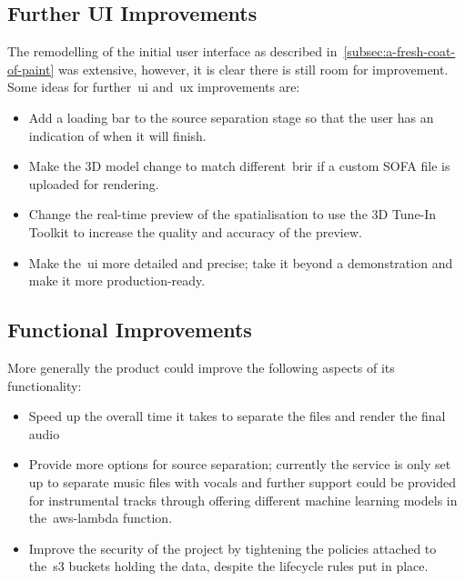 \subsection{Further UI Improvements}\label{subsec:ui-improvements}

The remodelling of the initial user interface as described in~\ref{subsec:a-fresh-coat-of-paint} was extensive,
however, it is clear there is still room for improvement.
Some ideas for further~\gls{ui} and~\gls{ux} improvements are:
\begin{itemize}
    \item Add a loading bar to the source separation stage so that the user has an indication of when it will finish.
    \item Make the 3D model change to match different~\gls{brir} if a custom SOFA file is uploaded for rendering.
    \item Change the real-time preview of the spatialisation to use the 3D Tune-In Toolkit to increase the quality and accuracy of the preview.
    \item Make the~\gls{ui} more detailed and precise; take it beyond a demonstration and make it more production-ready.
\end{itemize}

\subsection{Functional Improvements}\label{subsec:functional-improvements}

More generally the product could improve the following aspects of its functionality:

\begin{itemize}
    \item Speed up the overall time it takes to separate the files and render the final audio
    \item Provide more options for source separation; currently the service is only set up to separate music files with vocals and further support could be provided for instrumental tracks through offering different machine learning models in the~\gls{aws-lambda} function.
    \item Improve the security of the project by tightening the policies attached to the~\gls{s3} buckets holding the data, despite the lifecycle rules put in place.
\end{itemize}